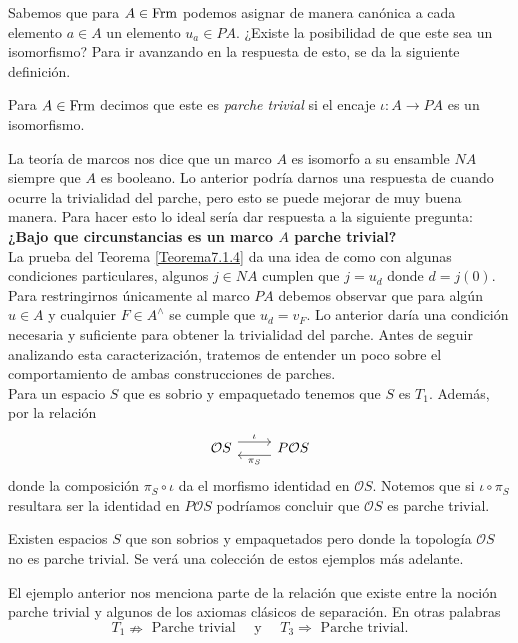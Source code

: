 Sabemos que para $A\in \mathrm{Frm}$ podemos asignar de manera canónica a cada elemento $a\in A$ un elemento $u_a\in PA$. ¿Existe la posibilidad de que este sea un isomorfismo? Para ir avanzando en la respuesta de esto, se da la siguiente definición.

\begin{dfn}\label{Parche trivial}
    Para $A\in \mathrm{Frm}$ decimos que este es \emph{parche trivial} si el encaje $\iota\colon A\to PA$ es un isomorfismo.
\end{dfn}

La teoría de marcos nos dice que un marco $A$ es isomorfo a su ensamble $NA$ siempre que $A$ es booleano. Lo anterior podría darnos una respuesta de cuando ocurre la trivialidad del parche, pero esto se puede mejorar de muy buena manera. Para hacer esto lo ideal sería dar respuesta a la siguiente pregunta: \textbf{¿Bajo que circunstancias es un marco $A$ parche trivial?}\\

La prueba del Teorema \ref{Teorema7.1.4} da una idea de como con algunas condiciones particulares, algunos $j\in NA$ cumplen que $j=u_d$ donde $d=j(0)$. Para  restringirnos únicamente al marco $PA$ debemos observar que para algún $u\in A$ y cualquier $F\in A^\wedge$ se cumple que $u_d=v_F$. Lo anterior daría una condición necesaria y suficiente para obtener la trivialidad del parche. Antes de seguir analizando esta caracterización, tratemos de entender un poco sobre el comportamiento de ambas construcciones de parches.\\

Para un espacio $S$ que es sobrio y empaquetado tenemos que $S$ es $T_1$. Además, por la relación 
\[\begin{tikzcd}
	{\mathcal{O}S} & {P\mathcal{O}S}
	\arrow["\iota", shift left=2, from=1-1, to=1-2]
	\arrow["{\pi_S}", shift left=2, from=1-2, to=1-1]
\end{tikzcd}\]
donde la composición $\pi_S\circ\iota$ da el morfismo identidad en $\mathcal{O}S$. Notemos que si $\iota\circ \pi_S$ resultara ser la identidad en $P\mathcal{O}S$ podríamos concluir que $\mathcal{O}S$ es parche trivial.

\begin{ej}\label{Ejemplo8.1.3}
    Existen espacios $S$ que son sobrios y empaquetados pero donde la topología $\mathcal{O}S$ no es parche trivial. Se verá una colección de estos ejemplos más adelante.
\end{ej}

El ejemplo anterior nos menciona parte de la relación que existe entre la noción parche trivial y algunos de los axiomas clásicos de separación. En otras palabras
\[
T_1\nRightarrow \mbox{ Parche trivial} \quad \mbox{ y }\quad T_3\Rightarrow \mbox{ Parche trivial}.
\]

